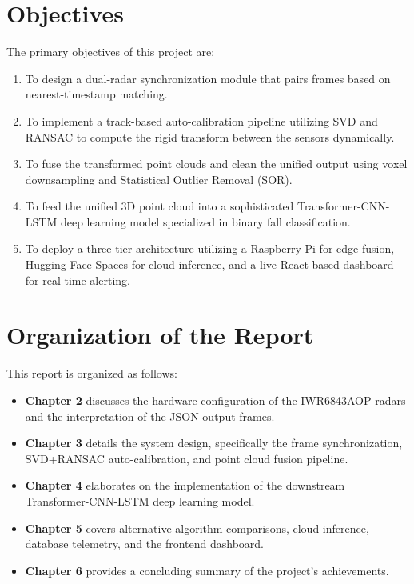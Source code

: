 \section[Objectives]{\textbf{Objectives}}
The primary objectives of this project are:
\begin{enumerate}
\item To design a dual-radar synchronization module that pairs frames based on nearest-timestamp matching.
\item To implement a track-based auto-calibration pipeline utilizing SVD and RANSAC to compute the rigid transform between the sensors dynamically.
\item To fuse the transformed point clouds and clean the unified output using voxel downsampling and Statistical Outlier Removal (SOR).
\item To feed the unified 3D point cloud into a sophisticated Transformer-CNN-LSTM deep learning model specialized in binary fall classification.
\item To deploy a three-tier architecture utilizing a Raspberry Pi for edge fusion, Hugging Face Spaces for cloud inference, and a live React-based dashboard for real-time alerting.
\end{enumerate}

\section[Organization of the Report]{\textbf{Organization of the Report}}
This report is organized as follows:
\begin{itemize}
\item \textbf{Chapter 2} discusses the hardware configuration of the IWR6843AOP radars and the interpretation of the JSON output frames.
\item \textbf{Chapter 3} details the system design, specifically the frame synchronization, SVD+RANSAC auto-calibration, and point cloud fusion pipeline.
\item \textbf{Chapter 4} elaborates on the implementation of the downstream Transformer-CNN-LSTM deep learning model.
\item \textbf{Chapter 5} covers alternative algorithm comparisons, cloud inference, database telemetry, and the frontend dashboard.
\item \textbf{Chapter 6} provides a concluding summary of the project's achievements.
\end{itemize}